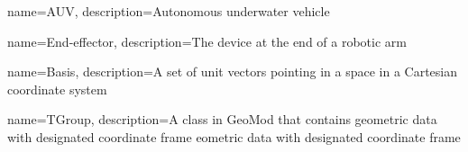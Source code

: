 {
        name=AUV,
        description={Autonomous underwater vehicle}
}

{
        name=End-effector,
        description={The device at the end of a robotic arm}
}


{
        name=Basis,
        description={A set of unit vectors pointing in a space in a Cartesian coordinate system}
}

{
        name=TGroup,
        description={A class in GeoMod that contains geometric data with designated coordinate frame eometric data with designated coordinate frame}
}
